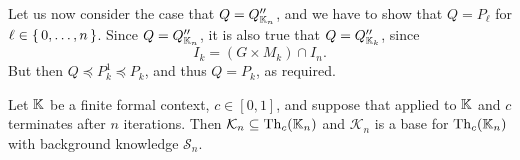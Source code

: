 \begin{Proof}
  Let us now consider the case that $Q = Q_{{\mathbb{K}}_{n}}''$, and we have to show that $Q =
  P_{\ell}$ for $\ell \in {\ensuremath{\{\, 0, \dots, n \,\}}}$.  Since $Q = Q_{{\mathbb{K}}_{n}}''$, it is also
  true that $Q = Q_{{\mathbb{K}}_{k}}''$, since
  \begin{equation*}
    I_{k} = (G \times M_{k}) \cap I_{n}.
  \end{equation*}
  But then $Q \preceq P_{k}^{1} \preceq P_{k}$, and thus $Q = P_{k}$, as required.
\end{Proof}

\begin{Theorem}
  \label{thm:confident-bases-with-growing-sets-of-attributes}
  Let ${\mathbb{K}}$ be a finite formal context, $c \in [0,1]$, and suppose that
   applied to ${\mathbb{K}}$ and $c$ terminates
  after $n$ iterations.  Then $\mathcal{K}_{n} \subseteq \operatorname{Th}_{c}({\mathbb{K}}_{n})$ and
  $\mathcal{K}_{n}$ is a base for $\operatorname{Th}_{c}({\mathbb{K}}_{n})$ with background knowledge
  $\mathcal{S}_{n}$.
\end{Theorem}

